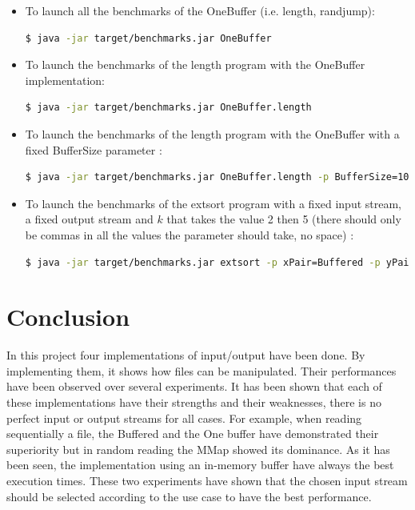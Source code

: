 \documentclass[12pt]{article}
\begin{document}
\begin{itemize}

\item To launch all the benchmarks of the OneBuffer (i.e. length, randjump):
\begin{lstlisting}[language=bash]
  $ java -jar target/benchmarks.jar OneBuffer
\end{lstlisting}

\item To launch the benchmarks of the length program with the OneBuffer implementation:
\begin{lstlisting}[language=bash]
  $ java -jar target/benchmarks.jar OneBuffer.length
\end{lstlisting}

\item To launch the benchmarks of the length program with the OneBuffer with a fixed BufferSize parameter :
\begin{lstlisting}[language=bash]
  $ java -jar target/benchmarks.jar OneBuffer.length -p BufferSize=1024
\end{lstlisting}

\item To launch the benchmarks of the extsort program with a fixed input stream, a fixed output stream and $k$ that takes the value 2 then 5 (there should only be commas in all the values the parameter should take, no space) :
\begin{lstlisting}[language=bash]
  $ java -jar target/benchmarks.jar extsort -p xPair=Buffered -p yPair=Mmap -p k=2,5
\end{lstlisting}

\end{itemize}

\section{Conclusion}

In this project four implementations of input/output have been done. By implementing them, it shows how files can be manipulated. Their performances have been observed over several experiments. It has been shown that each of these implementations have their strengths and their weaknesses, there is no perfect input or output streams for all cases. For example, when reading sequentially a file, the Buffered and the One buffer have demonstrated their superiority but in random reading the MMap showed its dominance. As it has been seen, the implementation using an in-memory buffer have always the best execution times. These two experiments have shown that the chosen input stream should be selected according to the use case to have the best performance.
\end{document}
